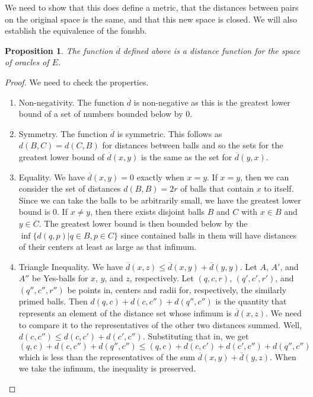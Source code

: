 \documentclass[12pt]{article}
\newtheorem{proposition}{Proposition}
\theoremstyle{remark}
\begin{document}
We need to show that this does define a metric, that the distances between pairs on the original space is the same, and that this new space is closed. We will also establish the equivalence of the fonshb. 

\begin{proposition}
    The function $\overline{d}$ defined above is a distance function for the space of oracles of $E$. 
\end{proposition}

\begin{proof}
We need to check the properties. 
\begin{enumerate}
\item Non-negativity. The function $\overline{d}$ is non-negative as this is the greatest lower bound of a set of numbers bounded below by 0. 
\item Symmetry. The function $\overline{d}$ is symmetric. This follows as $d(B,C) = d(C,B)$ for distances between balls and so the sets for the greatest lower bound of $\overline{d}(x,y)$ is the same as the set for $\overline{d}(y,x)$.
\item Equality. We have $\overline{d}(x,y) = 0$ exactly when $x=y$. If $x=y$, then we can consider the set of distances $d(B,B)= 2r$ of balls that contain $x$ to itself. Since we can take the balls to be arbitrarily small, we have the greatest lower bound is 0. If $x \neq y$, then there exists disjoint balls $B$ and $C$ with $x \in B$ and $y \in C$. The greatest lower bound is then bounded below by the $\inf\{d(q,p) | q \in B, p \in C\}$ since contained balls in them will have distances of their centers at least as large as that infimum. 
\item Triangle Inequality. We have $\overline{d}(x,z) \leq \overline{d}(x,y) + \overline{d}(y,y)$. Let $A$, $A'$, and $A''$ be Yes-balls for $x$, $y$, and $z$, respectively. Let $(q,c, r)$, $(q',c', r')$, and $(q'', c'', r'')$ be points in, centers and radii for, respectively, the similarly primed balls. Then $d(q,c) + d(c, c'') + d(q'',c'')$ is the quantity that represents an element of the distance set whose infimum is $\overline{d}(x,z)$. We need to compare it to the representatives of the other two distances summed. Well, $d(c,c'') \leq d(c,c') + d(c', c'')$. Substituting that in, we get $(q,c) + d(c, c'') + d(q'',c'') \leq (q,c) + d(c,c') + d(c', c'') + d(q'',c'')$ which is less than the representatives of the sum $\overline{d}(x,y) + \overline{d}(y,z)$. When we take the infimum, the inequality is preserved. 
\end{enumerate}
\end{proof}
\end{document}
